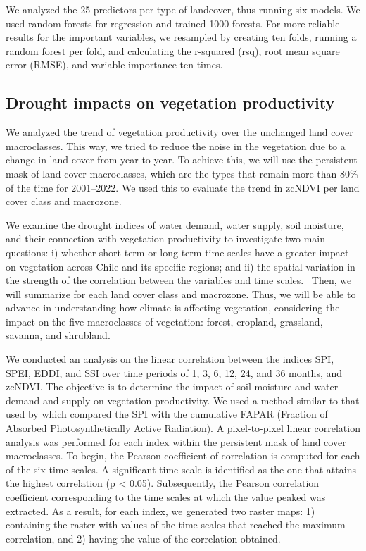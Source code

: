 \documentclass[
  authoryear,
  preprint,
  3p,
  onecolumn]{elsarticle}
\begin{document}
We analyzed the 25 predictors per type of landcover, thus running six
models. We used random forests for regression and trained 1000 forests.
For more reliable results for the important variables, we resampled by
creating ten folds, running a random forest per fold, and calculating
the r-squared (rsq), root mean square error (RMSE), and variable
importance ten times.

\hypertarget{drought-impacts-on-vegetation-productivity}{%
\subsection{Drought impacts on vegetation
productivity}\label{drought-impacts-on-vegetation-productivity}}

We analyzed the trend of vegetation productivity over the unchanged land
cover macroclasses. This way, we tried to reduce the noise in the
vegetation due to a change in land cover from year to year. To achieve
this, we will use the persistent mask of land cover macroclasses, which
are the types that remain more than 80\% of the time for 2001--2022. We
used this to evaluate the trend in zcNDVI per land cover class and
macrozone.

We examine the drought indices of water demand, water supply, soil
moisture, and their connection with vegetation productivity to
investigate two main questions: i) whether short-term or long-term time
scales have a greater impact on vegetation across Chile and its specific
regions; and ii) the spatial variation in the strength of the
correlation between the variables and time scales.~ Then, we will
summarize for each land cover class and macrozone. Thus, we will be able
to advance in understanding how climate is affecting vegetation,
considering the impact on the five macroclasses of vegetation: forest,
cropland, grassland, savanna, and shrubland.

We conducted an analysis on the linear correlation between the indices
SPI, SPEI, EDDI, and SSI over time periods of 1, 3, 6, 12, 24, and 36
months, and zcNDVI. The objective is to determine the impact of soil
moisture and water demand and supply on vegetation productivity. We used
a method similar to that used by \citet{Meroni2017} which compared the
SPI with the cumulative FAPAR (Fraction of Absorbed Photosynthetically
Active Radiation). A pixel-to-pixel linear correlation analysis was
performed for each index within the persistent mask of land cover
macroclasses. To begin, the Pearson coefficient of correlation is
computed for each of the six time scales. A significant time scale is
identified as the one that attains the highest correlation (p
\textless{} 0.05). Subsequently, the Pearson correlation coefficient
corresponding to the time scales at which the value peaked was
extracted. As a result, for each index, we generated two raster maps: 1)
containing the raster with values of the time scales that reached the
maximum correlation, and 2) having the value of the correlation
obtained.
\end{document}

